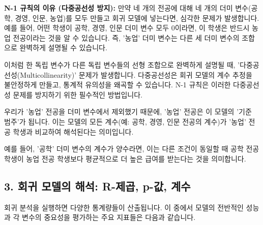 \documentclass[11pt,a4paper]{article}
\theoremstyle{definition}
\begin{document}
\textbf{N-1 규칙의 이유 (다중공선성 방지):}
만약 네 개의 전공에 대해 네 개의 더미 변수(공학, 경영, 인문, 농업)를 모두 만들고 회귀 모델에 넣는다면, 심각한 문제가 발생합니다. 예를 들어, 어떤 학생이 공학, 경영, 인문 더미 변수 모두 0이라면, 이 학생은 반드시 농업 전공이라는 것을 알 수 있습니다. 즉, '농업' 더미 변수는 다른 세 더미 변수의 조합으로 완벽하게 설명될 수 있습니다.

이처럼 한 독립 변수가 다른 독립 변수들의 선형 조합으로 완벽하게 설명될 때, '다중공선성(Multicollinearity)' 문제가 발생합니다. 다중공선성은 회귀 모델의 계수 추정을 불안정하게 만들고, 통계적 유의성을 왜곡할 수 있습니다. N-1 규칙은 이러한 다중공선성 문제를 방지하기 위한 필수적인 방법입니다.

\begin{tcolorbox}[example={기준 범주의 역할}]
우리가 '농업' 전공을 더미 변수에서 제외했기 때문에, '농업' 전공은 이 모델의 '기준 범주'가 됩니다. 이는 모델의 모든 계수(예: 공학, 경영, 인문 전공의 계수)가 '농업' 전공 학생과 비교하여 해석된다는 의미입니다.

예를 들어, '공학' 더미 변수의 계수가 양수라면, 이는 다른 조건이 동일할 때 공학 전공 학생이 농업 전공 학생보다 평균적으로 더 높은 급여를 받는다는 것을 의미합니다.
\end{tcolorbox}

\subsection{3. 회귀 모델의 해석: R-제곱, p-값, 계수}

회귀 분석을 실행하면 다양한 통계량들이 산출됩니다. 이 중에서 모델의 전반적인 성능과 각 변수의 중요성을 평가하는 주요 지표들은 다음과 같습니다.
\end{document}
